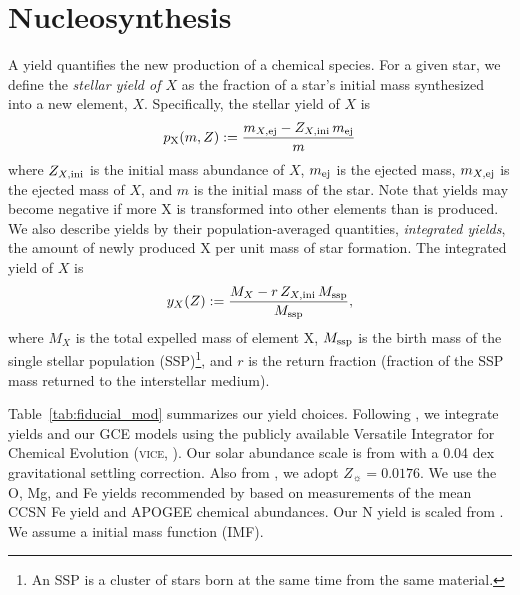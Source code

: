 \documentclass[fleqn,
usenatbib]{mnras}
\newcommand{\VICE}{\textsc{vice}}
\newcommand{\y}{p}
\newcommand{\Zo}{ Z_{\sun}}
\begin{document}
\section{Nucleosynthesis}\label{sec:nucleosynthesis}

A yield quantifies the new production of a chemical species. For a given star, we define the {\it stellar yield of $X$} as the fraction of a star's initial mass synthesized into a new element, $X$. Specifically, the stellar yield of $X$ is
\begin{equation} \label{eq:stellar_yield_def}
   \y_{\rm X}(m, Z) := 
    \frac{m_{X, \rm ej}- Z_{X,\rm  ini}\,m_{\rm ej}}{m}
\end{equation}
where $Z_{X,\rm ini}$ is the initial mass abundance of $X$, $m_{\rm ej}$ is the ejected mass, $m_{X, \rm ej}$ is the ejected mass of $X$, and $m$ is the initial mass of the star.
Note that yields may become negative if more X is transformed into other elements than is produced.
We also describe yields by their population-averaged quantities, {\it integrated yields}, the amount of newly produced X per unit mass of star formation. 
The integrated yield of $X$ is
\begin{equation} 
   y_{X}(Z) := 
    \frac{M_X - r\,Z_{X, \rm ini}\,M_{\rm ssp}}{M_{\rm ssp}},
\end{equation}
where $M_X$ is the total expelled mass of element X, $M_{\rm ssp}$ is the birth mass of the single stellar population (SSP)\footnote{An SSP is a cluster of stars born at the same time from the same material.}, and $r$ is the return fraction (fraction of the SSP mass returned to the interstellar medium). 

Table~\ref{tab:fiducial_mod} summarizes our yield choices. 
Following \citet{james+23}, we integrate yields and our GCE models using the publicly available Versatile Integrator for Chemical Evolution (\VICE, \citealt{JW20}). Our solar abundance scale is from \citet{magg+22} with a 0.04 dex gravitational settling correction. Also from \citet{magg+22}, we adopt $\Zo = 0.0176$. We use the O, Mg, and Fe yields recommended by \citet{david_fe} based on measurements of the mean CCSN Fe yield \citep{rodriguez+23} and APOGEE chemical abundances.
Our N yield is scaled from \citep{james+23}.
We assume a \citet{kroupa01} initial mass function (IMF).
\end{document}
